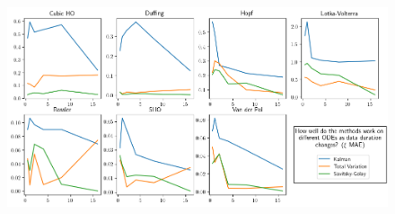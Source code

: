 \documentclass{article}
\begin{document}
\begin{figure}
    \label{fig:mae}
    \includegraphics[width=\textwidth]{images/summary_mae}
\end{figure}
\end{document}
